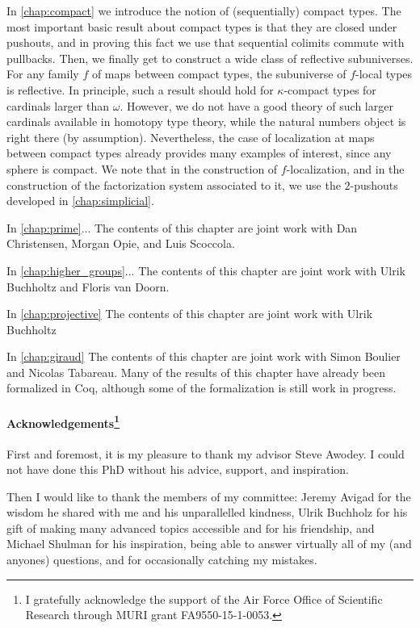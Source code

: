 In \cref{chap:compact} we introduce the notion of (sequentially) compact types. The most important basic result about compact types is that they are closed under pushouts, and in proving this fact we use that sequential colimits commute with pullbacks.
Then, we finally get to construct a wide class of reflective subuniverses. For any family $f$ of maps between compact types, the subuniverse of $f$-local types is reflective. In principle, such a result should hold for $\kappa$-compact types for cardinals larger than $\omega$. However, we do not have a good theory of such larger cardinals available in homotopy type theory, while the natural numbers object is right there (by assumption). Nevertheless, the case of localization at maps between compact types already provides many examples of interest, since any sphere is compact. We note that in the construction of $f$-localization, and in the construction of the factorization system associated to it, we use the $2$-pushouts developed in \cref{chap:simplicial}.

In \cref{chap:prime}...
The contents of this chapter are joint work with Dan Christensen, Morgan Opie, and Luis Scoccola.

In \cref{chap:higher_groups}...
The contents of this chapter are joint work with Ulrik Buchholtz and Floris van Doorn.

In \cref{chap:projective}
The contents of this chapter are joint work with Ulrik Buchholtz

In \cref{chap:giraud}
The contents of this chapter are joint work with Simon Boulier and Nicolas Tabareau. Many of the results of this chapter have already been formalized in Coq, although some of the formalization is still work in progress.


\paragraph{Acknowledgements\footnote{I gratefully acknowledge the support of the Air Force Office of Scientific Research through MURI grant FA9550-15-1-0053.}}
First and foremost, it is my pleasure to thank my advisor Steve Awodey. I could not have done this PhD without his advice, support, and inspiration.

Then I would like to thank the members of my committee: Jeremy Avigad for the wisdom he shared with me and his unparallelled kindness, Ulrik Buchholz for his gift of making many advanced topics accessible and for his friendship, and Michael Shulman for his inspiration, being able to answer virtually all of my (and anyones) questions, and for occasionally catching my mistakes.

